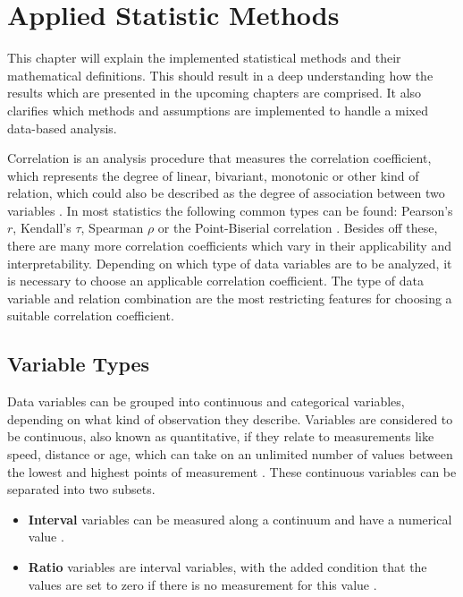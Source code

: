 \chapter{Applied Statistic Methods}
\label{definition_correlation}
This chapter will explain the implemented statistical methods and their mathematical definitions. This should result in a deep understanding how the results which are presented in the upcoming chapters are comprised. It also clarifies which methods and assumptions are implemented to handle a mixed data-based analysis.

\bigskip

Correlation is an analysis procedure that measures the correlation coefficient, which represents the degree of linear, bivariant, monotonic or other kind of relation, which could also be described as the degree of association between two variables \parencite{HerzSchlicherSiegener1992}. In most statistics the following common types can be found: Pearson's $r$, Kendall's $\tau$, Spearman  $\rho$ or the Point-Biserial correlation \parencite{Ramzai2020,SPSS2020a,SPSS2020b}. Besides off these, there are many more correlation coefficients which vary in their applicability and interpretability. Depending on which type of data variables are to be analyzed, it is necessary to choose an applicable correlation coefficient. The type of data variable and relation combination are the most restricting features for choosing a suitable correlation coefficient. 

\section{Variable Types}
\label{correlation_variable_types}
Data variables can be grouped into continuous and categorical variables, depending on what kind of observation they describe. Variables are considered to be continuous, also known as quantitative, if they relate to measurements like speed, distance or age, which can take on an unlimited number of values between the lowest and highest points of measurement \parencite{McCue2007}. These continuous variables can be separated into two subsets. 

\begin{itemize}
	\item \textbf{Interval} variables can be measured along a continuum and have a numerical value \parencite{Laerd2020}.
    \item \textbf{Ratio} variables are interval variables, with the added condition that the values are set to zero if there is no measurement for this value \parencite{Laerd2020}.
\end{itemize}


